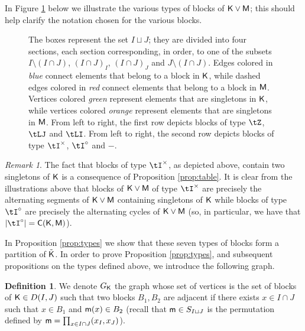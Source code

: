 \documentclass[11pt, a4paper, oneside, reqno]{amsart}
\newcommand{\sK}{{\sf K}}
\newcommand{\setK}{{D(I,J)}}
\newcommand{\sM}{{\sf M}}
\theoremstyle{remark}
\newtheorem{remark}[theorem]{Remark}
\theoremstyle{definition}
\newtheorem{definition}[theorem]{Definition}
\numberwithin{equation}{section}
\begin{document}
In Figure \ref{fig:BlockTypes} below we illustrate the various types of blocks of $\sK \vee \sM$; this should help clarify the notation chosen for the various blocks.
\begin{figure}[h]
\centering
\def\svgwidth{0.5\linewidth}

\caption{The boxes represent the set $I\sqcup J$; they are divided into four sections, each section corresponding, in order, to one of the subsets $I \setminus (I \cap J)$, $(I\cap J)_I$, $(I\cap J)_J$ and $J\setminus (I \cap J)$. Edges colored in \emph{blue} connect elements that belong to a block in $\sK$, while dashed edges colored in \emph{red} connect elements that belong to a block in $\sM$. Vertices colored \emph{green} represent elements that are singletons in $\sK$, while vertices colored \emph{orange} represent elements that are singletons in $\sM$. From left to right, the first row depicts blocks of type $\tZ$, $\tLJ$ and $\tLI$. From left to right, the second row depicts blocks of type $\tI^\times$, $\tI^\circ$ and $-$.}
\label{fig:BlockTypes}
\end{figure}
\begin{remark}
\label{rmk:RemarkOnTypesAndCylesSegments}
The fact that blocks of type $\tI^\times$, as depicted above, contain two singletons of $\sK$ is a consequence of Proposition \ref{prop:table}. It is clear from the illustrations above that blocks of $\sK \vee \sM$ of type $\tI^\times$ are precisely the alternating segments of $\sK \vee \sM$ containing singletons of $\sK$ while blocks of type $\tI^\circ$ are precisely the alternating cycles of $\sK \vee \sM$ (so, in particular, we have that $|\tI^\circ|  = {\sf C}(\sK, \sM)$).

\end{remark}
In Proposition \ref{prop:types} we show that these seven types of blocks form a partition of $\tilde{\sK}$. In order to prove Proposition \ref{prop:types}, and subsequent propositions on the types defined above, we introduce the following graph. 
\begin{definition}
	We denote $G_{\sf K}$ the graph whose set of vertices is the set of blocks of ${\sf K} \in \setK$ such that two blocks $B_1, B_2$ are adjacent if there exists $x \in I\cap J$ such that $x \in B_1$ and ${\sf m}(x) \in B_2$ (recall that ${\sf m} \in S_{I \sqcup J}$ is the permutation defined by ${\sf m}=\prod_{x \in {I \cap J}} (x_I,x_J)$).
\end{definition}
\end{document}
